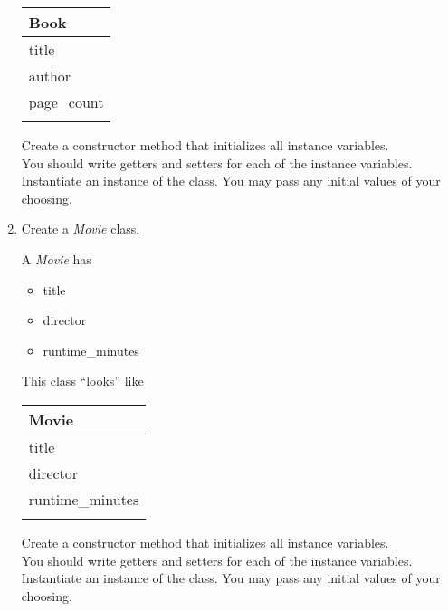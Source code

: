\documentclass{article}
\begin{document}
\begin{enumerate}
\begin{minipage}{.4\textwidth}
		\vspace*{1em}
		\begin{tabular}{|l|}
			\hline Book\\ \hline
			title\\ author\\ page\_count\\ \hline
			\\  \hline
		\end{tabular}
	\end{minipage}

	\vspace*{2ex}
	Create a constructor method that initializes all instance variables.\\
	You should write getters and setters for each of the instance variables.\\
	Instantiate an instance of the class. You may pass any initial values of your choosing.



	\item Create a \textit{Movie} class.\\
	\begin{minipage}{.6\textwidth}		
		A \textit{Movie} has
		\begin{itemize}
			\item title 
			\item director
			\item runtime\_minutes	
		\end{itemize}
	\end{minipage}
	\begin{minipage}{.4\textwidth}
		This class ``looks'' like 
				
		\vspace*{1em}
		\begin{tabular}{|l|}
			\hline Movie\\ \hline
			title\\ director\\ runtime\_minutes\\ \hline
			\\  \hline
		\end{tabular}
	\end{minipage}

	\vspace*{2ex}
	Create a constructor method that initializes all instance variables.\\
	You should write getters and setters for each of the instance variables.\\
	Instantiate an instance of the class. You may pass any initial values of your choosing.



\end{enumerate}
\end{document}
